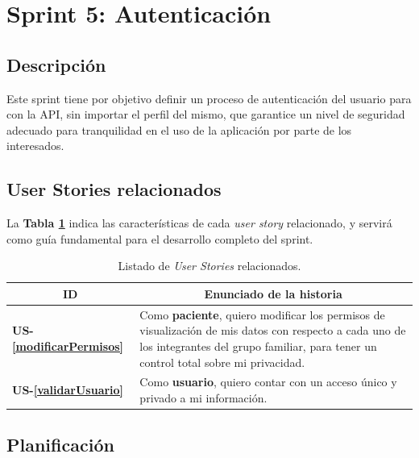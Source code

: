 \section{Sprint 5: Autenticación}%

\subsection{Descripción}

Este sprint tiene por objetivo definir un proceso de autenticación del usuario para con la API, sin importar el perfil del mismo, que garantice un nivel de seguridad adecuado para tranquilidad en el uso de la aplicación por parte de los interesados. 

\subsection{User Stories relacionados}

La \textbf{Tabla \ref{US-Sprint5}} indica las características de cada \textit{user story} relacionado, y servirá como guía fundamental para el desarrollo completo del sprint.

\begin{table}[h]
	\centering
	\begin{tabular}{|m{1.5cm}|m{11.5cm}|}
		\hline
		\multicolumn{1}{|c|}{\textbf{ID}} &
		\multicolumn{1}{c|}{\textbf{Enunciado de la historia}} \\          
		\hline
		\textbf{US-\ref{modificarPermisos}} & Como \textbf{paciente}, quiero modificar los permisos de visualización de mis datos con respecto a cada uno de los integrantes del grupo familiar, para tener un control total sobre mi privacidad. \\
		\hline 
		\textbf{US-\ref{validarUsuario} } & Como \textbf{usuario}, quiero contar con un acceso único y privado a mi información. \\
		\hline 
	\end{tabular}
	\caption{Listado de \textit{User Stories} relacionados.}
	\label{US-Sprint5}
\end{table}


\subsection{Planificación}

